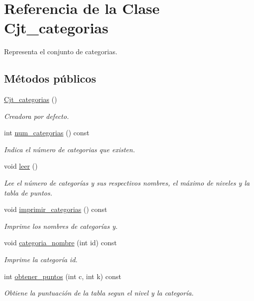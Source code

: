 \hypertarget{class_cjt__categorias}{}\section{Referencia de la Clase Cjt\+\_\+categorias}
\label{class_cjt__categorias}


Representa el conjunto de categorias.  


\subsection*{Métodos públicos}
\begin{DoxyCompactItemize}
\item 
\hyperlink{class_cjt__categorias_acb1bba449ac618047f1ac5f9f7756ec1}{Cjt\+\_\+categorias} ()
\begin{DoxyCompactList}\small\item\em Creadora por defecto. \end{DoxyCompactList}\item 
int \hyperlink{class_cjt__categorias_a8d99bf913eb3aaf562e5a086faaae517}{num\+\_\+categorias} () const
\begin{DoxyCompactList}\small\item\em Indica el número de categorias que existen. \end{DoxyCompactList}\item 
void \hyperlink{class_cjt__categorias_a25f0264b46b1c1de5af074bfae1ee5ed}{leer} ()
\begin{DoxyCompactList}\small\item\em Lee el número de categorías y sus respectivos nombres, el máximo de niveles y la tabla de puntos. \end{DoxyCompactList}\item 
void \hyperlink{class_cjt__categorias_acd18a2fe2b4336dd5faa7e418962d713}{imprimir\+\_\+categorias} () const
\begin{DoxyCompactList}\small\item\em Imprime los nombres de categorías y. \end{DoxyCompactList}\item 
void \hyperlink{class_cjt__categorias_a1b0f9a447879796a42ee0dac753f8779}{categoria\+\_\+nombre} (int id) const
\begin{DoxyCompactList}\small\item\em Imprime la categoría id. \end{DoxyCompactList}\item 
int \hyperlink{class_cjt__categorias_abddf6d1471987a718e12485f58b95c1b}{obtener\+\_\+puntos} (int c, int k) const
\begin{DoxyCompactList}\small\item\em Obtiene la puntuación de la tabla segun el nivel y la categoría. \end{DoxyCompactList}\end{DoxyCompactItemize}
